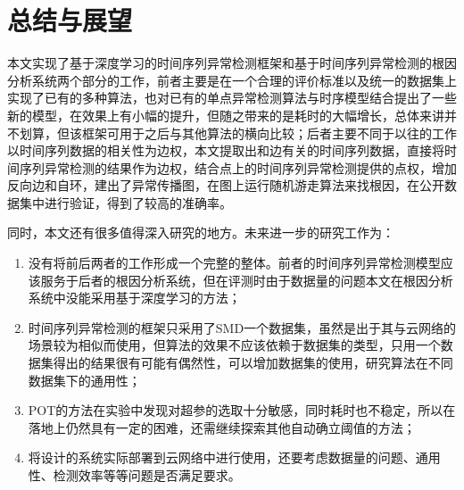 
\chapter{总结与展望}
\label{cha:summary}
本文实现了基于深度学习的时间序列异常检测框架和基于时间序列异常检测的根因分析系统两个部分的工作，前者主要是在一个合理的评价标准以及统一的数据集上实现了已有的多种算法，也对已有的单点异常检测算法与时序模型结合提出了一些新的模型，在效果上有小幅的提升，但随之带来的是耗时的大幅增长，总体来讲并不划算，但该框架可用于之后与其他算法的横向比较；后者主要不同于以往的工作以时间序列数据的相关性为边权，本文提取出和边有关的时间序列数据，直接将时间序列异常检测的结果作为边权，结合点上的时间序列异常检测提供的点权，增加反向边和自环，建出了异常传播图，在图上运行随机游走算法来找根因，在公开数据集中进行验证，得到了较高的准确率。

同时，本文还有很多值得深入研究的地方。未来进一步的研究工作为：
\begin{enumerate}
    \item 没有将前后两者的工作形成一个完整的整体。前者的时间序列异常检测模型应该服务于后者的根因分析系统，但在评测时由于数据量的问题本文在根因分析系统中没能采用基于深度学习的方法；
    \item 时间序列异常检测的框架只采用了SMD一个数据集，虽然是出于其与云网络的场景较为相似而使用，但算法的效果不应该依赖于数据集的类型，只用一个数据集得出的结果很有可能有偶然性，可以增加数据集的使用，研究算法在不同数据集下的通用性；
    \item POT的方法在实验中发现对超参的选取十分敏感，同时耗时也不稳定，所以在落地上仍然具有一定的困难，还需继续探索其他自动确立阈值的方法；
    \item 将设计的系统实际部署到云网络中进行使用，还要考虑数据量的问题、通用性、检测效率等等问题是否满足要求。
\end{enumerate}

